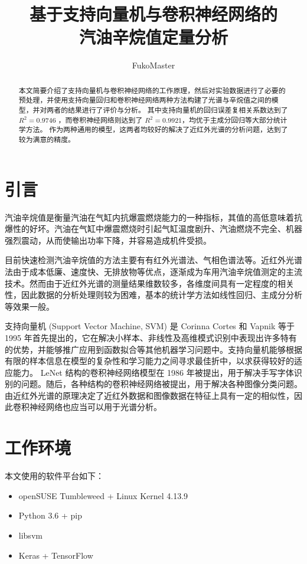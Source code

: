 \documentclass[a4paper]{article}
\title{基于支持向量机与卷积神经网络的\\汽油辛烷值定量分析}
\author{FukoMaster}
\begin{document}
	\maketitle
	
	\begin{abstract}
		本文简要介绍了支持向量机与卷积神经网络的工作原理，然后对实验数据进行了必要的预处理，并使用支持向量回归和卷积神经网络两种方法构建了光谱与辛烷值之间的模型，并对两者的结果进行了评价与分析。
		其中支持向量机的回归误差复相关系数达到了 $R^2=0.9746$ ，而卷积神经网络则达到了 $R^2=0.9921$，均优于主成分回归等大部分统计学方法。
		作为两种通用的模型，这两者均较好的解决了近红外光谱的分析问题，达到了较为满意的精度。
	\end{abstract}
	
	\tableofcontents
	
	\section{引言}
		汽油辛烷值是衡量汽油在气缸内抗爆震燃烧能力的一种指标，其值的高低意味着抗爆性的好坏。汽油在气缸中爆震燃烧时引起气缸温度剧升、汽油燃烧不完全、机器强烈震动，从而使输出功率下降，并容易造成机件受损。
		
		目前快速检测汽油辛烷值的方法主要有有红外光谱法、气相色谱法等。近红外光谱法由于成本低廉、速度快、无排放物等优点，逐渐成为车用汽油辛烷值测定的主流技术。然而由于近红外光谱的测量结果维数较多，各维度间具有一定程度的相关性，因此数据的分析处理则较为困难，基本的统计学方法如线性回归、主成分分析等效果一般。
		
		支持向量机 (Support Vector Machine, SVM) 是 Corinna Cortes 和 Vapnik 等于 1995 年首先提出的，它在解决小样本、非线性及高维模式识别中表现出许多特有的优势，并能够推广应用到函数拟合等其他机器学习问题中。支持向量机能够根据有限的样本信息在模型的复杂性和学习能力之间寻求最佳折中，以求获得较好的适应能力。
		LeNet 结构的卷积神经网络模型在 1986 年被提出，用于解决手写字体识别的问题。随后，各种结构的卷积神经网络被提出，用于解决各种图像分类问题。由近红外光谱的原理决定了近红外数据和图像数据在特征上具有一定的相似性，因此卷积神经网络也应当可以用于光谱分析。
		
	\section{工作环境}
		\noindent 本文使用的软件平台如下：
		
		\begin{itemize}
			\item openSUSE Tumbleweed + Linux Kernel 4.13.9
			\item Python 3.6 + pip
			\item libsvm
			\item Keras + TensorFlow
		\end{itemize}
	
\end{document}
